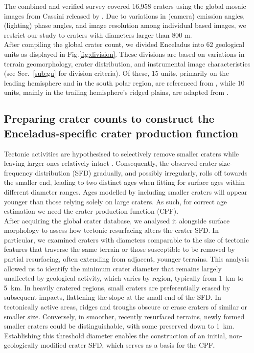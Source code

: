 \documentclass[preprint,11pt,3p,times,authoryear]{elsarticle}
\begin{document}
The combined and verified survey covered 16,958 craters using the global mosaic images from Cassini released by \citet{Bland2018}. Due to variations in (camera) emission angles, (lighting) phase angles, and image resolution among individual based images, we restrict our study to craters with diameters larger than 800 m. \\

After compiling the global crater count, we divided Enceladus into 62 geological units as displayed in  Fig.\ref{fig:division}. These divisions are based on variations in terrain geomorphology, crater distribution, and instrumental image characteristics (see Sec.~\ref{sub:gu} for division criteria).
Of these, 15 units, primarily on the leading hemisphere and in the south polar region, are referenced from \citet{CrowWillard2015}, while 10 units, mainly in the trailing hemisphere’s ridged plains, are adapted from \citet{Kirchoff2009}. \\


\subsection{Preparing crater counts to construct the Enceladus-specific crater production function}
\label{subsec:cpf}
Tectonic activities are hypothesised to selectively remove smaller craters while leaving larger ones relatively intact \citep{Michael2010}. Consequently, the observed crater size-frequency distribution (SFD) gradually, and possibly irregularly, rolls off towards the smaller end, leading to two distinct ages when fitting for surface ages within different diameter ranges. Ages modelled by including smaller craters will appear younger than those relying solely on large craters. As such, for correct age estimation we need the crater production function (CPF).\\

After acquiring the global crater database, we analysed it alongside surface morphology to assess how tectonic resurfacing alters the crater SFD. In particular, we examined craters with diameters comparable to the size of tectonic features that traverse the same terrain or those susceptible to be removed by partial resurfacing, often extending from adjacent, younger terrains. This analysis allowed us to identify the minimum crater diameter that remains largely unaffected by geological activity, which varies by region, typically from 1~km to 5~km. In heavily cratered regions, small craters are preferentially erased by subsequent impacts, flattening the slope at the small end of the SFD. In tectonically active areas, ridges and troughs obscure or erase craters of similar or smaller size. Conversely, in smoother, recently resurfaced terrains, newly formed smaller craters could be distinguishable, with some preserved down to 1~km. Establishing this threshold diameter enables the construction of an initial, non-geologically modified crater SFD, which serves as a basis for the CPF.\\
\end{document}
